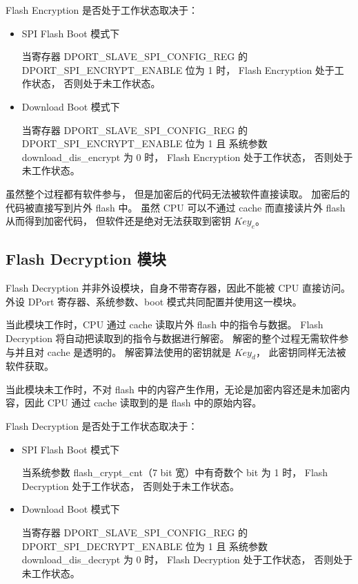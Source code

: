 \documentclass[main\_\_CN.tex]{subfiles}
\begin{document}
Flash Encryption 是否处于工作状态取决于：

\begin{itemize}

    \item SPI Flash Boot 模式下

    当寄存器 DPORT\_SLAVE\_SPI\_CONFIG\_REG 的 DPORT\_SPI\_ENCRYPT\_ENABLE 位为 1 时，
    Flash Encryption 处于工作状态，
    否则处于未工作状态。

    \item Download Boot 模式下

    当寄存器 DPORT\_SLAVE\_SPI\_CONFIG\_REG 的 DPORT\_SPI\_ENCRYPT\_ENABLE 位为 1 且
    系统参数 download\_dis\_encrypt 为 0 时，
    Flash Encryption 处于工作状态，
    否则处于未工作状态。

\end{itemize}

虽然整个过程都有软件参与，
但是加密后的代码无法被软件直接读取。
加密后的代码被直接写到片外 flash 中。
虽然 CPU 可以不通过 cache 而直接读片外 flash 从而得到加密代码，
但软件还是绝对无法获取到密钥 \begin{math}Key_{e}\end{math}。


\subsection{Flash Decryption 模块}

Flash Decryption 并非外设模块，自身不带寄存器，因此不能被 CPU 直接访问。
外设 DPort 寄存器、系统参数、boot 模式共同配置并使用这一模块。

当此模块工作时，CPU 通过 cache 读取片外 flash 中的指令与数据。
Flash Decryption 将自动把读取到的指令与数据进行解密。
解密的整个过程无需软件参与并且对 cache 是透明的。
解密算法使用的密钥就是 \begin{math}Key_{d}\end{math}，
此密钥同样无法被软件获取。

当此模块未工作时，不对 flash 中的内容产生作用，无论是加密内容还是未加密内容，因此 CPU 通过 cache 读取到的是 flash 中的原始内容。

Flash Decryption 是否处于工作状态取决于：

\begin{itemize}

    \item SPI Flash Boot 模式下

    当系统参数 flash\_crypt\_cnt（7 bit 宽）中有奇数个 bit 为 1 时，
    Flash Decryption 处于工作状态，
    否则处于未工作状态。

    \item Download Boot 模式下

    当寄存器 DPORT\_SLAVE\_SPI\_CONFIG\_REG 的 DPORT\_SPI\_DECRYPT\_ENABLE 位为 1 且
    系统参数 download\_dis\_decrypt 为 0 时，
    Flash Decryption 处于工作状态，
    否则处于未工作状态。
\end{itemize}
\end{document}
